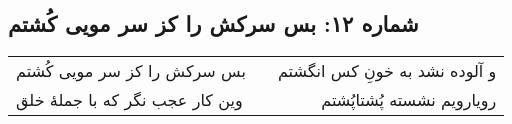 \begin{center}
\section*{شماره ۱۲: بس سرکش را کز سر مویی کُشتم}
\label{sec:012}
\begin{longtable}{l p{0.5cm} r}
بس سرکش را کز سر مویی کُشتم
&&
و آلوده نشد به خونِ کس انگشتم
\\
وین کار عجب نگر که با جملهٔ خلق
&&
رویارویم نشسته پُشتاپُشتم
\\
\end{longtable}
\end{center}
